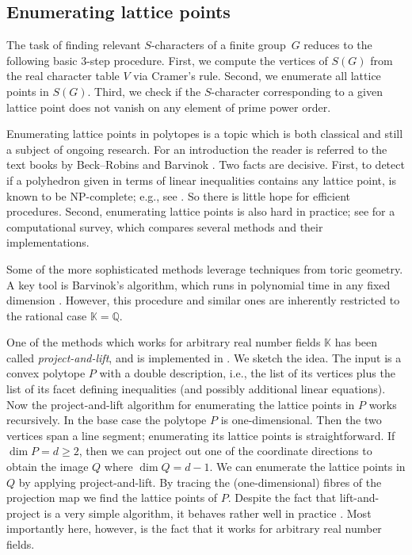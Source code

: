 \documentclass[12pt,leqno,a4paper]{amsart}
\newcommand{\KK}{{\mathbb{K}}}
\newcommand{\QQ}{{\mathbb{Q}}}
\newcommand{\polymake}{{\sf{polymake}}\xspace}
\theoremstyle{definition}
\begin{document}
\subsection{Enumerating lattice points}   \label{subsec:enum}
The task of finding relevant $S$-characters of a finite group~$G$ reduces to the following basic 3-step procedure.
First, we compute the vertices of $S(G)$ from the real character table $V$ via Cramer's rule.
Second, we enumerate all lattice points in $S(G)$.
Third, we check if the $S$-character corresponding to a given lattice point does not vanish on any element of prime power order.

Enumerating lattice points in polytopes is a topic which is both classical and
still a subject of ongoing research. For an introduction the reader is referred
to the text books by Beck--Robins \cite{BR} and Barvinok \cite{Bar}.
Two facts are decisive.
First, to detect if a polyhedron given in terms of linear inequalities contains
any lattice point, is known to be NP-complete; e.g., see \cite[Thm~18.1]{ILP}.
So there is little hope for efficient procedures.
Second, enumerating lattice points is also hard in practice; see \cite{polymake-lattice} for a computational survey, which compares several methods and their implementations.

Some of the more sophisticated methods leverage techniques from toric geometry.
A key tool is Barvinok's algorithm, which runs in polynomial time in any fixed dimension \cite[Chap.~17]{Bar}.
However, this procedure and similar ones are inherently restricted to the rational case $\KK=\QQ$.

One of the methods which works for arbitrary real number fields $\KK$ has been called \emph{project-and-lift}, and is implemented in \polymake.
We sketch the idea.
The input is a convex polytope $P$ with a double description, i.e., the list of its vertices plus the list of its facet defining inequalities (and possibly additional linear equations).
Now the project-and-lift algorithm for enumerating the lattice points in $P$ works recursively.
In the base case the polytope $P$ is one-dimensional.
Then the two vertices span a line segment; enumerating its lattice points is straightforward.
If $\dim P=d\geq 2$, then we can project out one of the coordinate directions to obtain the image $Q$ where $\dim Q=d-1$.
We can enumerate the lattice points in $Q$ by applying project-and-lift.
By tracing the (one-dimensional) fibres of the projection map we find the lattice points of $P$.
Despite the fact that lift-and-project is a very simple algorithm, it behaves rather well in practice \cite[Rule of Thumb 8]{polymake-lattice}.
Most importantly here, however, is the fact that it works for arbitrary real number fields.
\end{document}
